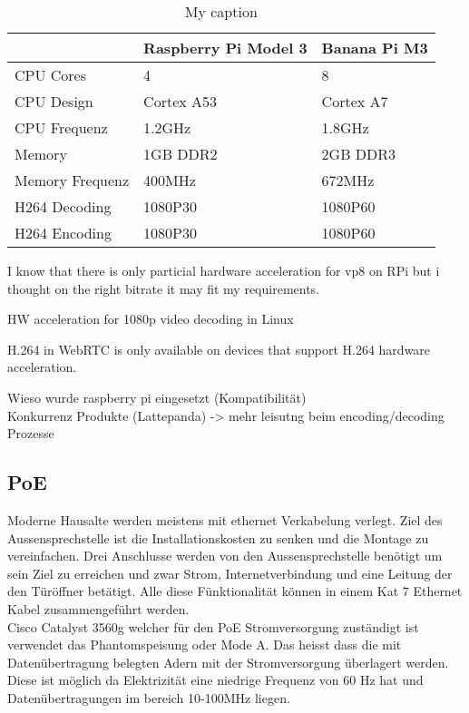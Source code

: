 \begin{table}[]
	\centering
	\label{my-label}
	\begin{tabular}{l|ll}
		\multicolumn{1}{r|}{} & Raspberry Pi Model 3 & Banana Pi M3 \\ \hline
		CPU Cores             & 4                    & 8            \\ \hline
		CPU Design            & Cortex A53           & Cortex A7    \\ \hline
		CPU Frequenz          & 1.2GHz               & 1.8GHz       \\ \hline
		Memory                & 1GB DDR2             & 2GB DDR3     \\ \hline
		Memory Frequenz       & 400MHz               & 672MHz       \\ \hline
		H264 Decoding         & 1080P30              & 1080P60      \\ \hline
		H264 Encoding         & 1080P30              & 1080P60      \\ \hline
	\end{tabular}
\caption{My caption}
\label{tbl:Comaparison}
\end{table}




I know that there is only particial hardware acceleration for vp8 on RPi but i thought on the right bitrate
it may fit my requirements.

HW acceleration for 1080p video decoding in Linux

H.264 in WebRTC is only available on devices that support H.264 hardware acceleration.

Wieso wurde raspberry pi eingesetzt (Kompatibilität)
\\
Konkurrenz Produkte (Lattepanda) -> mehr leisutng beim encoding/decoding Prozesse
\\

\subsection{PoE}
\label{sec:poe}
Moderne Hausalte werden meistens mit ethernet Verkabelung verlegt. Ziel des Aussensprechstelle ist die Installationskosten zu senken und die Montage zu vereinfachen. Drei Anschlusse werden von den Aussensprechstelle benötigt um sein Ziel zu erreichen und zwar Strom, Internetverbindung und eine Leitung der den Türöffner betätigt. Alle diese Fünktionalität können in einem Kat 7 Ethernet Kabel zusammengeführt werden. 
\\
Cisco Catalyst 3560g welcher für den PoE Stromversorgung zuständigt ist verwendet das Phantomspeisung oder Mode A. Das heisst dass die mit Datenübertragung belegten Adern mit der Stromversorgung überlagert werden. Diese ist möglich da Elektrizität eine niedrige Frequenz von 60 Hz hat und Datenübertragungen im bereich 10-100MHz liegen.

